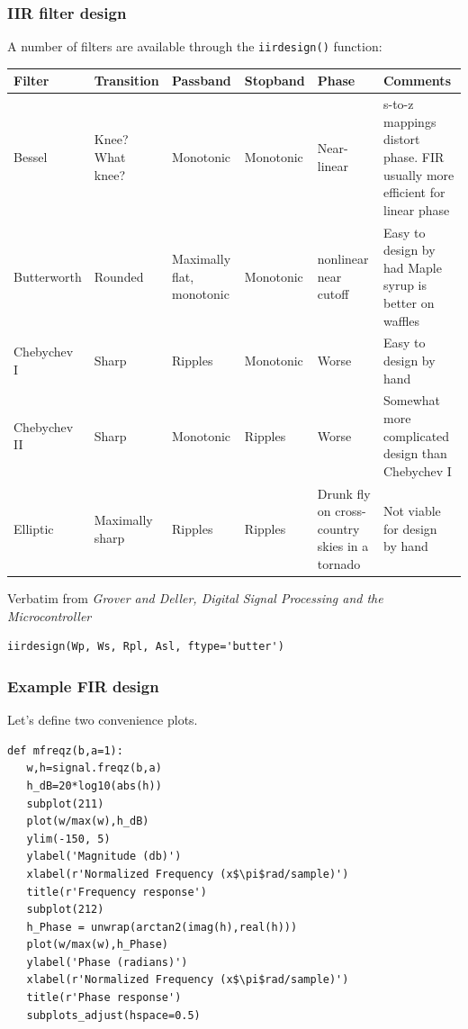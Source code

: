 \documentclass[10pt,colorlinks]{beamer}
\begin{document}
\begin{frame}[fragile]\frametitle{IIR filter design}

A number of filters are available through the \verb|iirdesign()| function:

\tiny \begin{tabular}{|l|p{1.5cm}|p{1.5cm}|l|p{1.5cm}|p{2cm}|}\hline
    Filter	& Transition &  Passband &Stopband&Phase&Comments \\ \hline
Bessel & 	Knee? What knee? & 	Monotonic&  	Monotonic & 	Near-linear & 	s-to-z mappings distort phase. FIR usually more efficient for linear phase \\

Butterworth & 	Rounded & 	Maximally flat, monotonic&  	Monotonic & 	nonlinear near cutoff & 	Easy to design by had Maple syrup is better on waffles \\

Chebychev I & 	Sharp & 	Ripples & 	Monotonic & 	Worse & 	Easy to design by hand \\

Chebychev II & 	Sharp&  	Monotonic 	& Ripples & 	Worse & 	Somewhat more complicated design than Chebychev I \\

Elliptic & 	Maximally sharp & 	Ripples & 	Ripples & 	Drunk fly on cross- country skies in a tornado & 	Not viable for design by hand \\ \hline

\end{tabular}
\tiny Verbatim from \emph{Grover and Deller, Digital Signal Processing and the Microcontroller}

\small
\begin{verbatim}
iirdesign(Wp, Ws, Rpl, Asl, ftype='butter')
\end{verbatim}
\end{frame}



\begin{frame}[fragile]\frametitle{Example FIR design}
Let's define two convenience plots. 
\small
\begin{verbatim}
def mfreqz(b,a=1):
   w,h=signal.freqz(b,a)
   h_dB=20*log10(abs(h))
   subplot(211)
   plot(w/max(w),h_dB)
   ylim(-150, 5)
   ylabel('Magnitude (db)') 
   xlabel(r'Normalized Frequency (x$\pi$rad/sample)')
   title(r'Frequency response')
   subplot(212)
   h_Phase = unwrap(arctan2(imag(h),real(h)))
   plot(w/max(w),h_Phase)
   ylabel('Phase (radians)')
   xlabel(r'Normalized Frequency (x$\pi$rad/sample)')
   title(r'Phase response')
   subplots_adjust(hspace=0.5)
\end{verbatim}

\end{frame}
\end{document}
